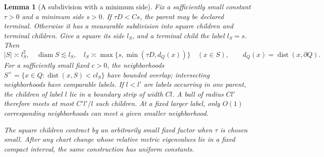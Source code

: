 \documentclass[11pt]{article}
\newtheorem{lemma}[theorem]{Lemma}
\numberwithin{equation}{section}
\begin{document}
\begin{lemma}[A subdivision with a minimum side]\label{lem:local-whitney}
Fix a sufficiently small constant $\tau>0$ and a minimum side $s>0$.
If $\tau D<Cs$, the parent may be declared terminal. Otherwise it has a
measurable subdivision into square children and terminal children. Give a
square its side $l_S$, and a terminal child the label $l_S=s$. Then
\[
 |S|\asymp l_S^2,\quad \operatorname{diam}S\lesssim l_S,
 \quad l_S\asymp\max\{s,\min(\tau D,d_Q(x))\}\quad(x\in S),
 \qquad d_Q(x)=\operatorname{dist}(x,\partial Q).
\]
For a sufficiently small fixed $c>0$, the neighborhoods
$S^+=\{x\in Q:\operatorname{dist}(x,S)<cl_S\}$ have bounded overlap;
intersecting neighborhoods have comparable labels. If $l<l'$ are labels
occurring in one parent, the children of label $l$ lie in a boundary strip
of width $Cl$. A ball of radius $Cl'$ therefore meets at most $C'l'/l$
such children. At a fixed larger label, only $O(1)$ corresponding
neighborhoods can meet a given smaller neighborhood.

The square children contract by an arbitrarily small fixed factor when
$\tau$ is chosen small. After any chart change whose relative metric
eigenvalues lie in a fixed compact interval, the same construction has
uniform constants.
\end{lemma}
\end{document}
